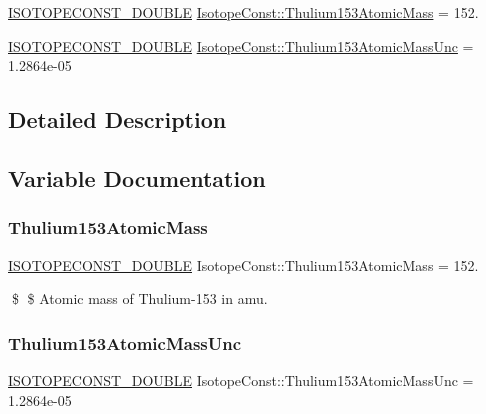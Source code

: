 \begin{DoxyCompactItemize}
\item 
\mbox{\hyperlink{group___isotope_const-_macros_ga8f45a7272ce02c0b4c65c44636ed719a}{I\+S\+O\+T\+O\+P\+E\+C\+O\+N\+S\+T\+\_\+\+D\+O\+U\+B\+LE}} \mbox{\hyperlink{group___isotope_const-_thulium-_tm153_ga449b379d017e065f637dd5ffe0a4656f}{Isotope\+Const\+::\+Thulium153\+Atomic\+Mass}} = 152.
\item 
\mbox{\hyperlink{group___isotope_const-_macros_ga8f45a7272ce02c0b4c65c44636ed719a}{I\+S\+O\+T\+O\+P\+E\+C\+O\+N\+S\+T\+\_\+\+D\+O\+U\+B\+LE}} \mbox{\hyperlink{group___isotope_const-_thulium-_tm153_ga797eb30ba0fcab1c7bf39631d144c5ec}{Isotope\+Const\+::\+Thulium153\+Atomic\+Mass\+Unc}} = 1.\+2864e-\/05
\end{DoxyCompactItemize}


\subsection{Detailed Description}


\subsection{Variable Documentation}
\mbox{\label{group___isotope_const-_thulium-_tm153_ga449b379d017e065f637dd5ffe0a4656f}} 
\subsubsection{\texorpdfstring{Thulium153\+Atomic\+Mass}{Thulium153AtomicMass}}
{\footnotesize\ttfamily \mbox{\hyperlink{group___isotope_const-_macros_ga8f45a7272ce02c0b4c65c44636ed719a}{I\+S\+O\+T\+O\+P\+E\+C\+O\+N\+S\+T\+\_\+\+D\+O\+U\+B\+LE}} Isotope\+Const\+::\+Thulium153\+Atomic\+Mass = 152.}

\$ \$ Atomic mass of Thulium-\/153 in amu. \mbox{\label{group___isotope_const-_thulium-_tm153_ga797eb30ba0fcab1c7bf39631d144c5ec}} 
\subsubsection{\texorpdfstring{Thulium153\+Atomic\+Mass\+Unc}{Thulium153AtomicMassUnc}}
{\footnotesize\ttfamily \mbox{\hyperlink{group___isotope_const-_macros_ga8f45a7272ce02c0b4c65c44636ed719a}{I\+S\+O\+T\+O\+P\+E\+C\+O\+N\+S\+T\+\_\+\+D\+O\+U\+B\+LE}} Isotope\+Const\+::\+Thulium153\+Atomic\+Mass\+Unc = 1.\+2864e-\/05}

